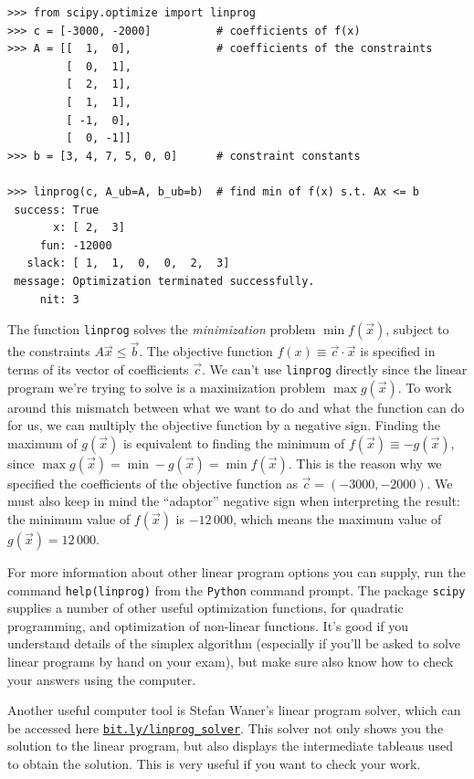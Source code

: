 \documentclass[11pt,oneside]{article}
\begin{document}
\begin{verbatim}
>>> from scipy.optimize import linprog   
>>> c = [-3000, -2000]          # coefficients of f(x) 
>>> A = [[  1,  0],             # coefficients of the constraints
         [  0,  1],
         [  2,  1],
         [  1,  1],
         [ -1,  0],
         [  0, -1]]
>>> b = [3, 4, 7, 5, 0, 0]      # constraint constants 

>>> linprog(c, A_ub=A, b_ub=b)  # find min of f(x) s.t. Ax <= b
 success: True
       x: [ 2,  3] 
     fun: -12000
   slack: [ 1,  1,  0,  0,  2,  3]
 message: Optimization terminated successfully.
     nit: 3
\end{verbatim}

		\noindent
		The function \texttt{linprog} solves the \emph{minimization} problem $\min f(\vec{x})$,
		subject to the constraints $A\vec{x} \leq \vec{b}$.
		The objective function $f(x)\equiv \vec{c} \cdot \vec{x}$ is specified in terms of its 
		vector of coefficients $\vec{c}$.
		We can't use \texttt{linprog} directly since the linear program we're trying to solve is a 
		maximization problem $\max g(\vec{x})$.
		To work around this mismatch between what we want to do and what the function can do for us,
		we can multiply the objective function by a negative sign.
		Finding the maximum of $g(\vec{x})$ is equivalent to finding the minimum of $f(\vec{x}) \equiv -g(\vec{x})$,
		since $\max g(\vec{x}) = \min -g(\vec{x}) = \min f(\vec{x})$.
		This is the reason why we specified the coefficients of the objective function as $\vec{c} = (-3000, -2000)$.
		We must also keep in mind the ``adaptor'' negative sign when interpreting the result:
		the minimum value of $f(\vec{x})$ is $-12\,000$, which means the maximum value of $g(\vec{x})=12\,000$.
		
		For more information about other linear program options you can supply,
		run the command \texttt{help(linprog)} from the \texttt{Python} command prompt.
		The package \texttt{scipy} supplies a number of other useful optimization functions,
		for quadratic programming, and optimization of non-linear functions.
		It's good if you understand details of the simplex algorithm
		(especially if you'll be asked to solve linear programs by hand on your exam),
		but make sure also know how to check your answers using the computer.
		
		Another useful computer tool is Stefan Waner's linear program solver,
		which can be accessed here \href{http://bit.ly/linprog_solver}{\texttt{bit.ly/linprog\_solver}}.
		This solver not only shows you the solution to the linear program,
		but also displays the intermediate tableaus used to obtain the solution.
		This is very useful if you want to check your work.
		
\end{document}
